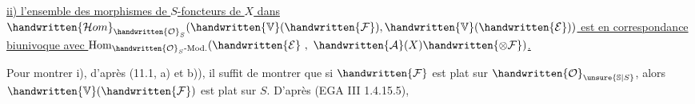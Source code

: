 \uline{ii) l'ensemble des morphismes de $S$-foncteurs de $X$ dans $\handwritten{\mathcal{H}om}_{\handwritten{\mathcal{O}}_S}(\handwritten{\mathbb{V}}(\handwritten{\mathcal{F}}),\handwritten{\mathbb{V}}(\handwritten{\mathcal{E}}))$ est en correspondance biunivoque avec $\operatorname{Hom}_{\handwritten{\mathcal{O}}_S\text{-}\mathrm{Mod.}}(\handwritten{\mathcal{E}}\ ,\ \handwritten{\mathcal{A}}(X)\handwritten{\otimes\mathcal{F}})$.}

Pour montrer i), d'après (11.1, a) et b)), il suffit de montrer que si $\handwritten{\mathcal{F}}$ est plat sur $\handwritten{\mathcal{O}}_{\unsure{\mathbb{S}|S}}$,  alors $\handwritten{\mathbb{V}}(\handwritten{\mathcal{F}})$ est plat sur $S$. D'après (EGA III 1.4.15.5),
